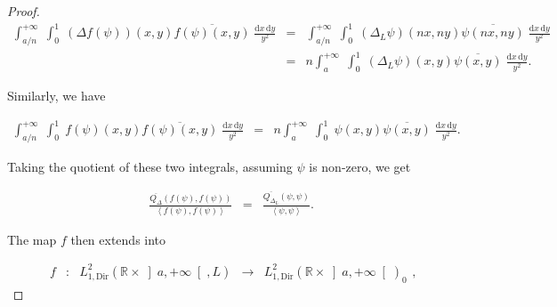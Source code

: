 \documentclass{jams-l}
\theoremstyle{definition}
\theoremstyle{remark}
\numberwithin{equation}{section}
\begin{document}
\begin{proof}
            \[ \begin{array}{lll}
                    \scriptstyle \int_{a/n}^{+ \infty} \; \int_0^1 \; \left( \Delta f \left( \psi \right) \right) \left( x, y \right) \overline{f \left( \psi \right) \left( x, y \right)} \; \frac{\mathrm{d}x \, \mathrm{d}y}{y^2} & \scriptstyle = & \scriptstyle \int_{a/n}^{+ \infty} \; \int_0^1 \; \left( \Delta_L \psi \right) \left( nx, ny \right) \overline{\psi \left( nx, ny \right)} \; \frac{\mathrm{d}x \, \mathrm{d}y}{y^2} \\[0.8em]
                    
                    & = & \scriptstyle n \int_{a}^{+ \infty} \; \int_0^1 \; \left( \Delta_L \psi \right) \left( x, y \right) \overline{\psi \left( x, y \right)} \; \frac{\mathrm{d}x \, \mathrm{d}y}{y^2}.
                \end{array} \]
            
            \noindent Similarly, we have
            
            \[ \begin{array}{lll}
                    \int_{a/n}^{+ \infty} \; \int_0^1 \; f \left( \psi \right) \left( x, y \right) \overline{f \left( \psi \right) \left( x, y \right)} \; \frac{\mathrm{d}x \, \mathrm{d}y}{y^2} & = & n \int_{a}^{+ \infty} \; \int_0^1 \; \psi \left( x, y \right) \overline{\psi \left( x, y \right)} \; \frac{\mathrm{d}x \, \mathrm{d}y}{y^2}.
                \end{array} \]
            
            \noindent Taking the quotient of these two integrals, assuming $\psi$ is non-zero, we get
            
            \begin{equation}
            \label{EqRayleighQuotient}
                \begin{array}{lll}
                    \frac{\overline{Q_{\Delta}} \left( f \left( \psi \right), f \left( \psi \right) \right)}{\left< f \left( \psi \right), f \left( \psi \right) \right>} & = & \frac{\overline{Q_{\Delta_L}} \left( \psi, \psi \right)}{\left< \psi, \psi \right>}.
                \end{array}
            \end{equation}
            
            \noindent The map $f$ then extends into
            
            \[ \begin{array}{lllll}
                    f & : & L^2_{1,\mathrm{Dir}} \left( \mathbb{R} \times \left] a, + \infty \right[, L \right) & \longrightarrow & L^2_{1,\mathrm{Dir}} \left( \mathbb{R} \times \left] a, + \infty \right[ \right)_0
                \end{array} , \]
            

\end{proof}
\end{document}
